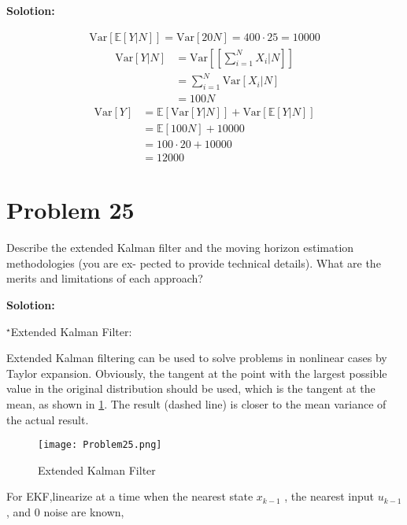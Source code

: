 \documentclass[a4paper,11pt,reqno]{amsart}
\begin{document}
\textbf{Solotion:}

$$
\begin{aligned}
    \text{Var}[\mathbb{E}[Y|N]]=\text{Var}[20N]=400\cdot 25=10000
\end{aligned}
$$
\vspace{1em}
$$
\begin{aligned}
    \text{Var}[Y|N]&=\text{Var}[[\sum^N_{i=1}X_i|N]]
    \\
    &=\sum^N_{i=1}\text{Var}[X_i|N]
    \\
    &=100N
\end{aligned}
$$
\vspace{1em}
$$
\begin{aligned}
    \text{Var}[Y]&=\mathbb{E}[\text{Var}[Y|N]]+\text{Var}[\mathbb{E}[Y|N]]
    \\
    &=\mathbb{E}[100N]+10000
    \\
    &=100\cdot 20+10000
    \\
    &=12000
\end{aligned}
$$

\section{Problem 25}
Describe the extended Kalman filter and the moving horizon estimation methodologies (you are ex-
pected to provide technical details). What are the merits and limitations of each approach?

\textbf{Solotion:}

$^{\star}$Extended Kalman Filter:

Extended Kalman filtering can be used to solve problems in nonlinear cases by Taylor expansion.
Obviously, the tangent at the point with the largest possible value in the original distribution 
should be used, which is the tangent at the mean, as shown in \ref{f12}. The result 
(dashed line) is closer to the mean variance of the actual result.%

\begin{figure}[H]
    \centering
    \texttt{[image: Problem25.png]}
    \caption{Extended Kalman Filter}
    \label{f12}
    \end{figure}

For EKF,linearize at a time when the nearest state $x_{k-1}$ , the nearest input $u_{k-1}$ , 
and 0 noise are known,
\end{document}
